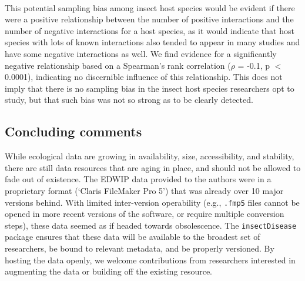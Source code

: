 \documentclass[12pt]{article}
\begin{document}
\paragraph*{}
This potential sampling bias among insect host species would be evident if there were a positive relationship between the number of positive interactions and the number of negative interactions for a host species, as it would indicate that host species with lots of known interactions also tended to appear in many studies and have some negative interactions as well. We find evidence for a significantly negative relationship based on a Spearman's rank correlation ($\rho$ = -0.1, p $<$ 0.0001), indicating no discernible influence of this relationship. This does not imply that there is no sampling bias in the insect host species researchers opt to study, but that such bias was not so strong as to be clearly detected. 



\subsection*{Concluding comments}

While ecological data are growing in availability, size, accessibility, and stability, there are still data resources that are aging in place, and should not be allowed to fade out of existence. The EDWIP data provided to the authors were in a proprietary format (`Claris FileMaker Pro 5') that was already over 10 major versions behind. With limited inter-version operability (e.g., \texttt{.fmp5} files cannot be opened in more recent versions of the software, or require multiple conversion steps), these data seemed as if headed towards obsolescence. The \texttt{insectDisease} package ensures that these data will be available to the broadest set of researchers, be bound to relevant metadata, and be properly versioned. By hosting the data openly, we welcome contributions from researchers interested in augmenting the data or building off the existing resource. 
\end{document}
